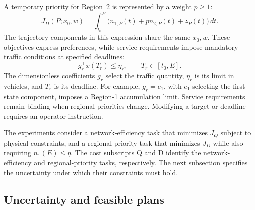 \documentclass[preprint,12pt]{elsarticle}
\theoremstyle{definition}
\theoremstyle{plain}
\theoremstyle{definition}
\theoremstyle{plain}
\begin{document}
A temporary priority for Region~2 is represented by a weight $p\ge1$:
\begin{equation}
J_D(P;x_0,w)=\int_{t_0}^{E}
 \bigl(n_{1,P}(t)+p n_{2,P}(t)+z_P(t)\bigr)\,dt.
\label{eq:benchmark-priority-cost}
\end{equation}
The trajectory components in this expression share the same $x_0,w$.
These objectives express preferences, while service requirements impose
mandatory traffic conditions at specified deadlines:
\begin{equation}
g_r^\top x(T_r)\le\eta_r,\qquad T_r\in[t_0,E].
\label{eq:new-service}
\end{equation}
The dimensionless coefficients $g_r$ select the traffic quantity,
$\eta_r$ is its limit in vehicles, and $T_r$ is its deadline. For example,
$g_r=e_1$, with $e_1$ selecting the first state component, imposes a
Region-1 accumulation limit. Service requirements
remain binding when regional priorities change. Modifying a target or
deadline requires an operator instruction.

The experiments consider a network-efficiency task that minimizes $J_Q$
subject to physical constraints, and a regional-priority task that
minimizes $J_D$ while also requiring $n_1(E)\le\eta$. The cost subscripts Q and D identify the network-efficiency and
regional-priority tasks, respectively. The next subsection specifies the uncertainty under
which their constraints must hold.

\subsection{Uncertainty and feasible plans}
\label{sec:problem-uncertainty}
\end{document}

